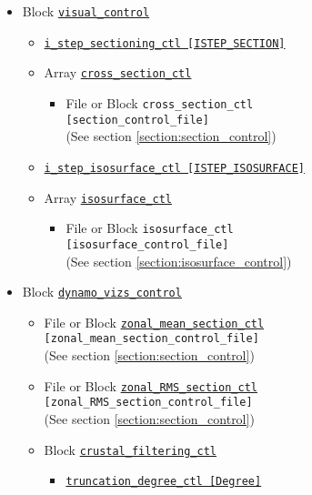 \begin{itemize}
\begin{itemize}
				{\tt mid\_equator\_monitor\_ctl}
		\begin{itemize}
		\item \hyperref[href_t:nphi_mid_eq_ctl]
				{\tt nphi\_mid\_eq\_ctl   [Nphi\_mid\_equator]}
				\label{href_i:nphi_mid_eq_ctl}
		\end{itemize}
	\end{itemize}
%
\item Block \hyperref[href_t:visual_control]{\tt visual\_control}
    \begin{itemize} \label{href_i:visual_control}
	\item \hyperref[href_t:i_step_sectioning_ctl]
        {\tt i\_step\_sectioning\_ctl  [ISTEP\_SECTION]}
    \item Array \hyperref[href_t:cross_section_ctl]{\tt cross\_section\_ctl}
		\begin{itemize}
        \item File or Block {\tt cross\_section\_ctl} \\
                            {\tt [section\_control\_file]} \\
								(See section \ref{section:section_control})
		\end{itemize}
%
    \item \hyperref[href_t:i_step_isosurface_ctl]
		{\tt i\_step\_isosurface\_ctl  [ISTEP\_ISOSURFACE]}
    \item Array \hyperref[href_t:isosurface_ctl]{\tt isosurface\_ctl}
		\begin{itemize}
		\item File or Block {\tt isosurface\_ctl} \\
                            {\tt [isosurface\_control\_file]} \\
								(See section \ref{section:isosurface_control})
		\end{itemize}
    \end{itemize}
%
\item Block \hyperref[href_t:dynamo_vizs_control]{\tt dynamo\_vizs\_control}
	\begin{itemize} \label{href_i:dynamo_vizs_control}
		\item File or Block \hyperref[href_t:zonal_mean_section_ctl]
							{\tt zonal\_mean\_section\_ctl} \\
							{\tt [zonal\_mean\_section\_control\_file]} \\
								(See section \ref{section:section_control})
		\item File or Block \hyperref[href_t:zonal_RMS_section_ctl]
							{\tt zonal\_RMS\_section\_ctl} \\
                            {\tt [zonal\_RMS\_section\_control\_file]} \\
                                (See section \ref{section:section_control})
%
		\item Block \hyperref[href_t:crustal_filtering_ctl]{\tt crustal\_filtering\_ctl}
			\begin{itemize}
				\item \hyperref[href_t:crustal_filtering_ctl]
						{\tt truncation\_degree\_ctl          [Degree]}
			\end{itemize}
	\end{itemize}
\end{itemize}
